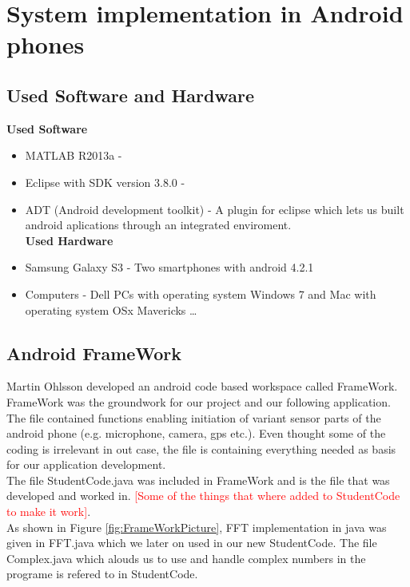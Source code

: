 \documentclass[12pt,a4paper,openright]{article}
\begin{document}


\section{System implementation in Android phones}

\subsection{Used Software and Hardware}
\textbf{Used Software}
\begin{itemize}
\item MATLAB R2013a - 
\item Eclipse with SDK version 3.8.0 -
\item ADT (Android development toolkit) - A plugin for eclipse which lets us built android aplications through an integrated enviroment. \\

\textbf{Used Hardware}
\item Samsung Galaxy S3 - Two smartphones with android 4.2.1
\item Computers - Dell PCs with operating system Windows 7 and Mac with operating system OSx Mavericks \ldots
\end{itemize}


\subsection{Android FrameWork}

Martin Ohlsson developed an android code based workspace called FrameWork. FrameWork was the groundwork for our project and our following application. The file contained functions enabling initiation of variant sensor parts of the android phone (e.g. microphone, camera, gps etc.). Even thought some of the coding is irrelevant in out case, the file is containing everything needed as basis for our application development. \\

The file StudentCode.java was included in FrameWork and is the file that was developed and worked in. \textcolor{red}{[Some of the things that where added to StudentCode to make it work]}.\\

As shown in Figure \ref{fig:FrameWorkPicture}, FFT implementation in java was given in FFT.java \cite{FFTJavaRef} which we later on used in our new StudentCode. The file Complex.java \cite{ComplexJavaRef} which alouds us to use and handle complex numbers in the programe is refered to in StudentCode. 
\end{document}
